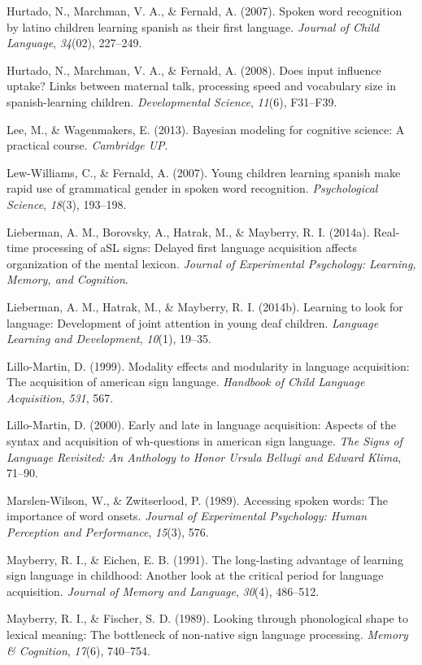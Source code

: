 \documentclass[12pt,]{article}
\begin{document}
Hurtado, N., Marchman, V. A., \& Fernald, A. (2007). Spoken word
recognition by latino children learning spanish as their first language.
\emph{Journal of Child Language}, \emph{34}(02), 227--249.

Hurtado, N., Marchman, V. A., \& Fernald, A. (2008). Does input
influence uptake? Links between maternal talk, processing speed and
vocabulary size in spanish-learning children. \emph{Developmental
Science}, \emph{11}(6), F31--F39.

Lee, M., \& Wagenmakers, E. (2013). Bayesian modeling for cognitive
science: A practical course. \emph{Cambridge UP}.

Lew-Williams, C., \& Fernald, A. (2007). Young children learning spanish
make rapid use of grammatical gender in spoken word recognition.
\emph{Psychological Science}, \emph{18}(3), 193--198.

Lieberman, A. M., Borovsky, A., Hatrak, M., \& Mayberry, R. I. (2014a).
Real-time processing of aSL signs: Delayed first language acquisition
affects organization of the mental lexicon. \emph{Journal of
Experimental Psychology: Learning, Memory, and Cognition}.

Lieberman, A. M., Hatrak, M., \& Mayberry, R. I. (2014b). Learning to
look for language: Development of joint attention in young deaf
children. \emph{Language Learning and Development}, \emph{10}(1),
19--35.

Lillo-Martin, D. (1999). Modality effects and modularity in language
acquisition: The acquisition of american sign language. \emph{Handbook
of Child Language Acquisition}, \emph{531}, 567.

Lillo-Martin, D. (2000). Early and late in language acquisition: Aspects
of the syntax and acquisition of wh-questions in american sign language.
\emph{The Signs of Language Revisited: An Anthology to Honor Ursula
Bellugi and Edward Klima}, 71--90.

Marslen-Wilson, W., \& Zwitserlood, P. (1989). Accessing spoken words:
The importance of word onsets. \emph{Journal of Experimental Psychology:
Human Perception and Performance}, \emph{15}(3), 576.

Mayberry, R. I., \& Eichen, E. B. (1991). The long-lasting advantage of
learning sign language in childhood: Another look at the critical period
for language acquisition. \emph{Journal of Memory and Language},
\emph{30}(4), 486--512.

Mayberry, R. I., \& Fischer, S. D. (1989). Looking through phonological
shape to lexical meaning: The bottleneck of non-native sign language
processing. \emph{Memory \& Cognition}, \emph{17}(6), 740--754.
\end{document}
